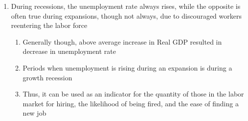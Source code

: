 \documentclass[11 pt, twoside]{article}
\begin{document}
\begin{enumerate}
\item During recessions, the unemployment rate always rises, while the opposite is often true during expansions, though not always, due to discouraged workers reentering the labor force
\begin{enumerate}
\item Generally though, above average increase in Real GDP resulted in decrease in unemployment rate
\item Periods when unemployment is rising during an expansion is during a growth recession
\item Thus, it can be used as an indicator for the quantity of those in the labor market for hiring, the likelihood of being fired, and the ease of finding a new job
\end{enumerate}
\end{enumerate}
\end{document}
